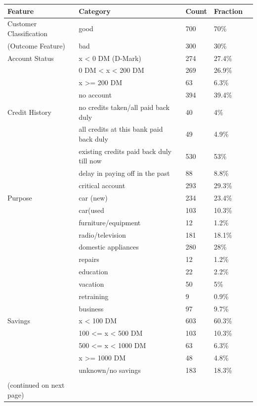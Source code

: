 \documentclass[12pt]{article}
\begin{document}
\begin{table}[!ht]
\centering
\begin{tabular}{lllll}
  \hline
Feature & Category & Count & Fraction \\ 
  \hline
Customer Classification & good & 700 & 70\% \\ 
(Outcome Feature) &bad & 300 & 30\% \\
\hline
Account Status & x < 0 DM (D-Mark) & 274 & 27.4\% \\ 
 & 0 DM < x < 200 DM & 269 & 26.9\% \\ 
 & x >= 200 DM & 63 & 6.3\% \\ 
& no account & 394 & 39.4\% \\ 
\hline
Credit History & no credits taken/all paid back duly & 40 & 4\% \\ 
& all credits at this bank paid back duly & 49 & 4.9\% \\ 
 & existing credits paid back duly till now & 530 & 53\% \\ 
 & delay in paying off in the past & 88 & 8.8\% \\ 
 & critical account & 293 & 29.3\% \\ 
\hline
 Purpose & car (new) & 234 & 23.4\% \\ 
 & car(used & 103 & 10.3\% \\ 
&furniture/equipment & 12 & 1.2\% \\ 
&radio/television & 181 & 18.1\% \\ 
& domestic appliances & 280 & 28\% \\ 
 &repairs & 12 & 1.2\% \\ 
 &education & 22 & 2.2\% \\ 
 &vacation & 50 & 5\% \\ 
 &retraining & 9 & 0.9\% \\ 
 &business & 97 & 9.7\% \\ 
\hline
 Savings & x < 100 DM & 603 & 60.3\% \\ 
&100 <= x <  500 DM & 103 & 10.3\% \\ 
&500 <= x < 1000 DM & 63 & 6.3\% \\ 
&x >= 1000 DM & 48 & 4.8\% \\ 
&unknown/no savings & 183 & 18.3\% \\ 
\hline\\
(continued on next page) & & & 
\end{tabular}
\end{table}
\end{document}
